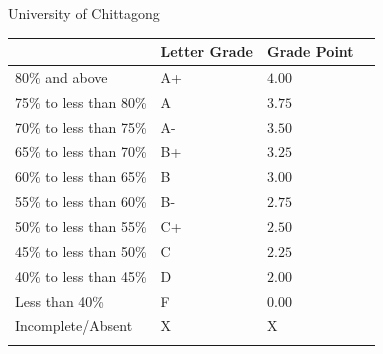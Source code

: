 \documentclass[11pt]{article}
\begin{document}
\begin{table}[hb]
\begin{minipage}[b]{0.19\linewidth}
            University of Chittagong
            \end{minipage}
            \end{table}

            \clearpage
\begin{table}[ht]
\begin{tabularx}{\linewidth}{llll}
     \begin{minipage}[m]{0.3\linewidth} \flushleft
\begin{small}
\begin{tabular}{ |c|>{\centering}m{0.9cm}|m{0.91cm}|}%
	\hline {\bf Numerical Range} & {\bf Letter Grade} & {\bf Grade Point} \\
	\hline   80\% and above & A+ & $4.00$  \\ 
	\hline   75\% to less than 80\% &  A & $3.75$\\ 
	\hline   70\% to less than 75\% &  A- & $3.50$ \\ 
	\hline   65\% to less than 70\% &  B+ & $3.25$\\ 
	\hline   60\% to less than 65\% &  B  & $3.00$\\ 
	\hline   55\% to less than 60\% &  B- & $2.75$\\ 
	\hline   50\% to less than 55\% &  C+ & $2.50$\\ 
	\hline   45\% to less than 50\% &  C  & $2.25$\\
	\hline   40\% to less than 45\% &  D  & $2.00$\\
	\hline   Less than 40\%         &  F  & $0.00$\\ 
	\hline   Incomplete/Absent         &  X  & X\\ 
	\hline 
	

\end{tabular}
\end{small}
\end{minipage}
\end{tabularx}
\end{table}
\end{document}
